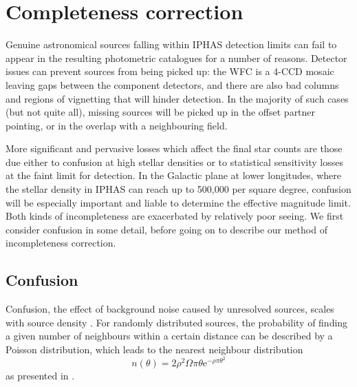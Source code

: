 \documentclass[a4paper,useAMS,usenatbib]{mn2e}
\begin{document}


\section[]{Completeness correction} 
\label{sec:completeness}

Genuine astronomical sources falling within IPHAS detection limits can fail to
appear in the resulting photometric catalogues for a number of reasons.   Detector issues can 
prevent sources from being picked up: the WFC is a 4-CCD mosaic leaving gaps
between the component detectors, and there are also bad columns and regions of
vignetting that will hinder detection. In the majority of such cases (but not quite all),
missing sources will be picked up in the offset partner pointing, or in the overlap with a 
neighbouring field.

More significant and pervasive losses which affect the final star counts are those
due either to confusion at high stellar densities or to statistical sensitivity losses at the faint limit
for detection.  In the Galactic plane at lower longitudes, where the stellar density in IPHAS can reach up
to 500,000 per square degree, confusion will be especially important and liable to determine the effective 
magnitude limit.  Both kinds of incompleteness are exacerbated by relatively poor seeing.  We first 
consider confusion in some detail, before going on to describe our method of incompleteness correction.

\subsection{Confusion}

Confusion, the effect of background noise caused by unresolved sources, scales with source density \citep{Condon1974}. 
For randomly distributed sources, the probability of finding a given number of neighbours within a certain 
distance can be described by a Poisson distribution, which leads to the nearest neighbour distribution 
\begin{equation}
n(\theta) = 2\rho^2\Omega\pi\theta\mathrm{e}^{-\rho\pi\theta^2}
\label{eq:theoretical_neighbours}
\end{equation}
\noindent as presented in \citet{Bahcall1986}.
\end{document}
